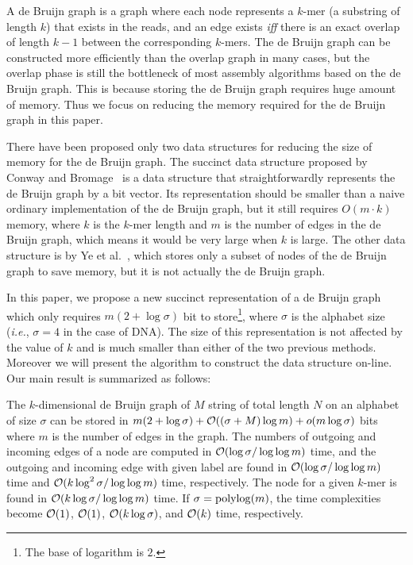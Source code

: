 A de Bruijn graph is a graph where each node represents a $k$-mer
(a substring of length $k$)
that exists in the reads, and an edge exists {\it iff} there is an 
exact overlap of length $k-1$ between the corresponding $k$-mers. 
The de Bruijn graph can be constructed more efficiently than the overlap graph 
in many cases, 
but the overlap phase is still the bottleneck of most assembly algorithms based 
on the de Bruijn graph. 
This is because storing the de Bruijn graph requires huge amount of memory. 
Thus we focus on reducing the memory required for the de Bruijn graph in this paper. 

There have been proposed only two data structures for
reducing the size of memory for the de Bruijn graph.
The succinct data structure proposed by Conway and Bromage~\cite{ConBro11}
is a data structure that straightforwardly
represents the de Bruijn graph by a bit vector.
Its representation should be smaller than a naive ordinary implementation of
the de Bruijn graph, but it still requires $O(m\cdot k)$ memory,
where $k$ is the $k$-mer length and $m$ is the number of edges in the de Bruijn graph,
which means it would be very large when $k$ is large.
The other data structure is by Ye et al.~\cite{YeMa12}, which
stores only a subset of nodes of the de Bruijn graph to save memory,
but it is not actually the de Bruijn graph.

In this paper, we propose a new succinct representation of a de Bruijn graph
which only requires $m(2+\log \sigma)$ bit to store\footnote{The base of logarithm is $2$.}, where
$\sigma$ is the alphabet size ({\it i.e.}, $\sigma = 4$ in the case of DNA).
The size of this representation is not affected by the value of $k$ and is
much smaller than either of the two previous methods.
Moreover we will present the algorithm to construct the data structure on-line.
Our main result is summarized as follows:
\begin{theorem}
The $k$-dimensional de Bruijn graph of $M$ string of total length $N$ on an alphabet of size $\sigma$
can be stored in $m(2+\log \sigma) + \mathcal{O}((\sigma+M) \log m) + o(m \log\sigma)$
bits where $m$ is the number of edges in the graph.  
The numbers of outgoing and incoming edges of a node are computed in $\mathcal{O}(\log\sigma/\log\log m)$ time,
and the outgoing and incoming edge with given label are found in $\mathcal{O}(\log\sigma/\log\log m)$ time
and $\mathcal{O}(k\log^2\sigma/\log\log m)$ time, respectively.
The node for a given $k$-mer is found in $\mathcal{O}(k\log\sigma/\log\log m)$ time.
If $\sigma = {\mathop{\mathrm{polylog}}\nolimits}(m)$, the time complexities become $\mathcal{O}(1)$, $\mathcal{O}(1)$, $\mathcal{O}(k\log\sigma)$,
and $\mathcal{O}(k)$ time, respectively.
\end{theorem}

